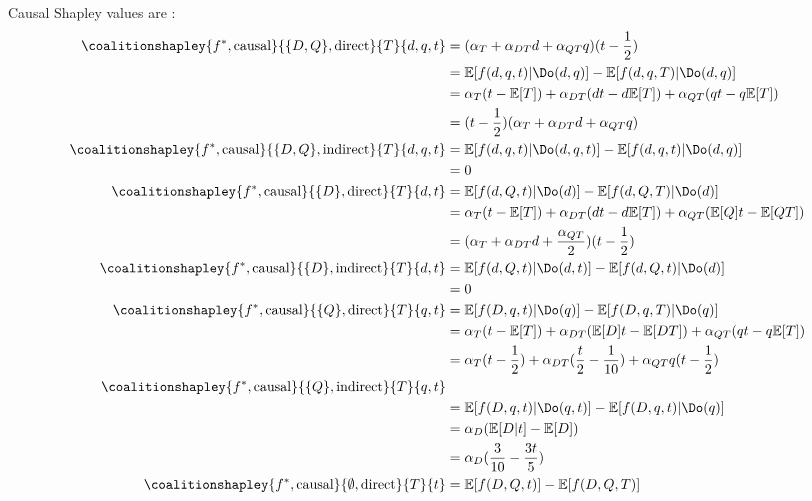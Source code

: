 Causal Shapley values are :
\begin{align*}
    \coalitionshapley{f^*,\text{causal}}{\{D,Q\},\text{direct}}{T}{d,q,t} &= (\alpha_T + \alpha_{DT} d + \alpha_{QT} q)(t - \frac{1}{2} ) \\
    &= \mathbb{E}[f(d,q,t) | \Do(d,q)] - \mathbb{E}[f(d,q,T) | \Do(d,q)] \\
    &= \alpha_T(t - \mathbb{E}[T]) + \alpha_{DT}(dt - d\mathbb{E}[T]) + \alpha_{QT}(qt - q\mathbb{E}[T]) \\
    &= (t - \frac{1}{2})(\alpha_T + \alpha_{DT}d + \alpha_{QT}q) \\
    \coalitionshapley{f^*,\text{causal}}{\{D,Q\},\text{indirect}}{T}{d,q,t} 
    &=  \mathbb{E}[f(d,q,t) | \Do(d,q,t)] - \mathbb{E}[f(d,q,t) | \Do(d,q)] \\
    &= 0 \\
    \coalitionshapley{f^*,\text{causal}}{\{D\},\text{direct}}{T}{d,t}
    &= \mathbb{E}[f(d,Q,t) | \Do(d)] - \mathbb{E}[f(d,Q,T) | \Do(d)] \\
    &= \alpha_T(t - \mathbb{E}[T]) + \alpha_{DT}(dt - d\mathbb{E}[T]) + \alpha_{QT}(\mathbb{E}[Q]t - \mathbb{E}[QT]) \\
    &= (\alpha_T + \alpha_{DT} d + \frac{\alpha_{QT}}{2} )(t - \frac{1}{2} ) \\
    \coalitionshapley{f^*,\text{causal}}{\{D\},\text{indirect}}{T}{d,t}
    &=  \mathbb{E}[f(d,Q,t) | \Do(d,t)] - \mathbb{E}[f(d,Q,t) | \Do(d)] \\
    &= 0 \\
    \coalitionshapley{f^*,\text{causal}}{\{Q\},\text{direct}}{T}{q,t}
    &= \mathbb{E}[f(D,q,t) | \Do(q)] - \mathbb{E}[f(D,q,T) | \Do(q)] \\
    &= \alpha_T(t - \mathbb{E}[T]) + \alpha_{DT}(\mathbb{E}[D]t - \mathbb{E}[DT]) + \alpha_{QT}(qt - q\mathbb{E}[T]) \\
    &=  \alpha_T(t - \frac{1}{2}) +  \alpha_{DT}(\frac{t}{2} - \frac{1}{10}) + \alpha_{QT}q (t - \frac{1}{2}) \\
    \coalitionshapley{f^*,\text{causal}}{\{Q\},\text{indirect}}{T}{q,t}  \\
    &=  \mathbb{E}[f(D,q,t) | \Do(q,t)] - \mathbb{E}[f(D,q,t) | \Do(q)] \\
    &= \alpha_D (\mathbb{E}[D|t] - \mathbb{E}[D]) \\
    &= \alpha_D (\frac{3}{10} - \frac{3t}{5}) \\
    \coalitionshapley{f^*,\text{causal}}{\emptyset,\text{direct}}{T}{t}
    &= \mathbb{E}[f(D,Q,t)] - \mathbb{E}[f(D,Q,T)] \\

\end{align*}
